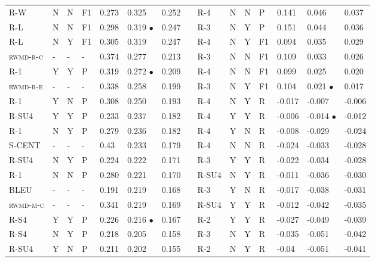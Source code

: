 \documentclass[11pt,a4paper]{article}
\begin{document}
\begin{table}[]
{\begin{tabular}{lllllllllllllll}
\textsc{R-W} & N & N & F1 & 0.273 & 0.325 & 0.252 &  & \textsc{R-4} & N & N & P & 0.141 & 0.046 & 0.037 \\
\textsc{R-L} & N & N & F1 & 0.298 & 0.319 $\bullet$ & 0.247 &  & \textsc{R-3} & N & Y & P & 0.151 & 0.044 & 0.036 \\
\textsc{R-L} & N & Y & F1 & 0.305 & 0.319 & 0.247 &  & \textsc{R-4} & N & Y & F1 & 0.094 & 0.035 & 0.029 \\
\textsc{rwmd-r-c} & - & - & - & 0.374 & 0.277 & 0.213 &  & \textsc{R-3} & N & N & F1 & 0.109 & 0.033 & 0.026 \\
\textsc{R-1} & Y & Y & P & 0.319 & 0.272 $\bullet$ & 0.209 &  & \textsc{R-4} & N & N & F1 & 0.099 & 0.025 & 0.020 \\
\textsc{rwmd-r-e} & - & - & - & 0.338 & 0.258 & 0.199 &  & \textsc{R-3} & N & Y & F1 & 0.104 & 0.021 $\bullet$ & 0.017 \\
\textsc{R-1} & Y & N & P & 0.308 & 0.250 & 0.193 &  & \textsc{R-4} & N & Y & R & -0.017 & -0.007 & -0.006 \\
\textsc{R-SU4} & Y & Y & P & 0.233 & 0.237 & 0.182 &  & \textsc{R-4} & Y & Y & R & -0.006 & -0.014 $\bullet$ & -0.012 \\
\textsc{R-1} & N & Y & P & 0.279 & 0.236 & 0.182 &  & \textsc{R-4} & Y & N & R & -0.008 & -0.029 & -0.024 \\
\textsc{S-CENT} & - & - & - & 0.43 & 0.233 & 0.179 &  & \textsc{R-4} & N & N & R & -0.024 & -0.033 & -0.028 \\
\textsc{R-SU4} & N & Y & P & 0.224 & 0.222 & 0.171 &  & \textsc{R-3} & Y & Y & R & -0.022 & -0.034 & -0.028 \\
\textsc{R-1} & N & N & P & 0.280 & 0.221 & 0.170 &  & \textsc{R-SU4} & N & Y & R & -0.011 & -0.036 & -0.030 \\
\textsc{BLEU} & - & - & - & 0.191 & 0.219 & 0.168 &  & \textsc{R-3} & Y & N & R & -0.017 & -0.038 & -0.031 \\
\textsc{rwmd-m-c} & - & - & - & 0.341 & 0.219 & 0.169 &  & \textsc{R-SU4} & Y & Y & R & -0.012 & -0.042 & -0.035 \\
\textsc{R-S4} & Y & Y & P & 0.226 & 0.216 $\bullet$ & 0.167 &  & \textsc{R-2} & Y & Y & R & -0.027 & -0.049 & -0.039 \\
\textsc{R-S4} & N & Y & P & 0.218 & 0.205 & 0.158 &  & \textsc{R-3} & N & Y & R & -0.035 & -0.051 & -0.042 \\
\textsc{R-SU4} & Y & N & P & 0.211 & 0.202 & 0.155 &  & \textsc{R-2} & N & Y & R & -0.04 & -0.051 & -0.041 \\

\end{tabular}}
\end{table}
\end{document}
